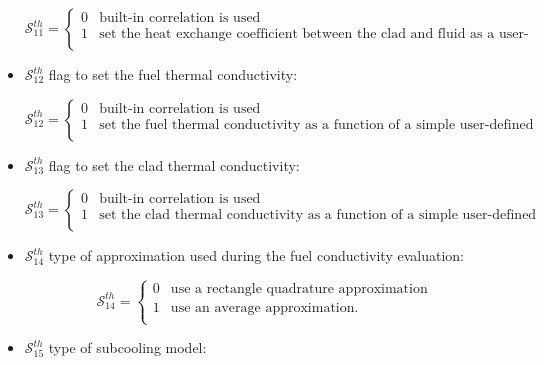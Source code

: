 \begin{itemize}
\begin{displaymath} \mathcal{S}^{th}_{11} = \left\{
\begin{array}{rl}
 0 & \textrm{built-in correlation is used} \\
 1 & \textrm{set the heat exchange coefficient between the clad and fluid as a user-defined constant.} \\
\end{array} \right.
\end{displaymath}

\item $\mathcal{S}^{th}_{12}$ flag to set the fuel thermal conductivity:

\begin{displaymath} \mathcal{S}^{th}_{12} = \left\{
\begin{array}{rl}
 0 & \textrm{built-in correlation is used} \\
 1 & \textrm{set the fuel thermal conductivity as a function of a simple user-defined correlation.} \\
\end{array} \right.
\end{displaymath}

\item $\mathcal{S}^{th}_{13}$ flag to set the clad thermal conductivity:

\begin{displaymath} \mathcal{S}^{th}_{13} = \left\{
\begin{array}{rl}
 0 & \textrm{built-in correlation is used} \\
 1 & \textrm{set the clad thermal conductivity as a function of a simple user-defined correlation.} \\
\end{array} \right.
\end{displaymath}

\item $\mathcal{S}^{th}_{14}$ type of approximation used during the fuel conductivity evaluation:

\begin{displaymath} \mathcal{S}^{th}_{14} = \left\{
\begin{array}{rl}
 0 & \textrm{use a rectangle quadrature approximation} \\
 1 & \textrm{use an average approximation.} \\
\end{array} \right.
\end{displaymath}

\item $\mathcal{S}^{th}_{15}$ type of subcooling model:


\end{itemize}
